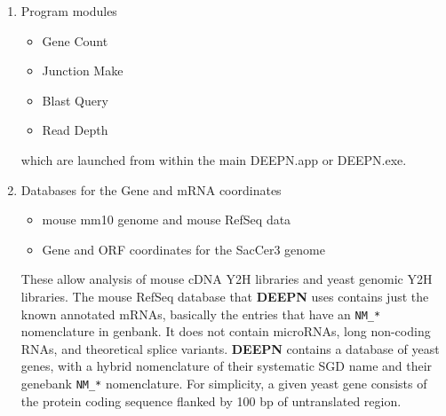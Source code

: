 \documentclass[11pt,fleqn]{book} %
\newcommand{\DEEPN}{\textbf{DEEPN }}
\begin{document}
\begin{enumerate}
\item Program modules
	\begin{itemize} 
		\item {\color{Red} Gene Count}
		\item {\color{Blue} Junction Make}
		\item {\color{ForestGreen} Blast Query}
		\item {\color{Bittersweet} Read Depth}
	\end{itemize}
which are launched from within the main DEEPN.app or DEEPN.exe.
\item Databases for the Gene and mRNA coordinates
	\begin{itemize} 
		\item mouse mm10 genome and mouse RefSeq data
		\item Gene and ORF coordinates for the SacCer3 genome
	\end{itemize}
These allow analysis of mouse cDNA Y2H libraries and yeast genomic Y2H libraries.  The mouse RefSeq database that \DEEPN uses contains just the known annotated mRNAs, basically the entries that have an \texttt{NM\_*} nomenclature in genbank.  It does not contain microRNAs, long non-coding RNAs, and theoretical splice variants. \DEEPN contains a database of yeast genes, with a hybrid nomenclature of their systematic SGD name and their genebank \texttt{NM\_*} nomenclature.  For simplicity, a given yeast gene consists of the protein coding sequence flanked by 100 bp of untranslated region.
	

\end{enumerate}
\end{document}
